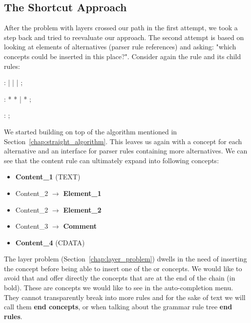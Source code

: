 \subsection{The Shortcut Approach}
\label{chap:shortcut_approach}

After the problem with layers crossed our path in the first attempt, we took a step back and tried to reevaluate our approach.
The second attempt is based on looking at elements of alternatives (parser rule references) and asking: "which concepts could be inserted in this place?".
Consider again the  rule and its child rules:

\begin{antlr}
	    :   
           |   
           |   
           |   
           ;

	    :   \literal{<}  * \literal{>} * \literal{</}  \literal{>}
           |   \literal{<}  * \literal{/>}
           ;

	    :   \literal{<!--}  \literal{-->} ;
\end{antlr}

We started building on top of the algorithm mentioned in Section~\ref{chap:straight_algorithm}.
This leaves us again with a concept for each alternative and an interface for parser rules containing more alternatives.
We can see that the content rule can ultimately expand into following concepts:

\begin{itemize}
	\itemsep0em
	\item \textbf{Content{\_}1} (TEXT)
	\item Content{\_}2 $\rightarrow$ \textbf{Element{\_}1}
	\item Content{\_}2 $\rightarrow$ \textbf{Element{\_}2}
	\item Content{\_}3 $\rightarrow$ \textbf{Comment}
	\item \textbf{Content{\_}4} (CDATA)
\end{itemize}

The layer problem (Section~\ref{chap:layer_problem}) dwells in the need of inserting the  concept before being able to insert one of the  or  concepts.
We would like to avoid that and offer directly the concepts that are at the end of the chain (in bold).
These are concepts we would like to see in the auto-completion menu.
They cannot transparently break into more rules and for the sake of text we will call them \textbf{end concepts}, or when talking about the grammar rule tree \textbf{end rules}.
\\

